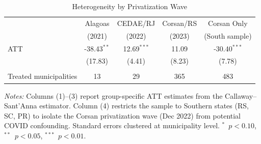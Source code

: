 \begin{table}[H]
\centering
\caption{Heterogeneity by Privatization Wave}
\label{tab:heterogeneity}
\begin{threeparttable}
\begin{tabular}{lcccc}
\toprule
 & Alagoas & CEDAE/RJ & Corsan/RS & Corsan Only \\
 & (2021) & (2022) & (2023) & (South sample) \\
\midrule
  ATT & -38.43$^{**}$ & 12.69$^{***}$ & 11.09 & -30.40$^{***}$ \\
  & (17.83) & (4.41) & (8.23) & (7.78) \\
\\
  Treated municipalities & 13 & 29 & 365 & 483 \\
\bottomrule
\end{tabular}
\begin{tablenotes}[flushleft]
\small
\item \textit{Notes:} Columns (1)--(3) report group-specific ATT estimates from the Callaway--Sant'Anna estimator. Column (4) restricts the sample to Southern states (RS, SC, PR) to isolate the Corsan privatization wave (Dec 2022) from potential COVID confounding. Standard errors clustered at municipality level. $^{*}$~$p<0.10$, $^{**}$~$p<0.05$, $^{***}$~$p<0.01$.
\end{tablenotes}
\end{threeparttable}
\end{table}
